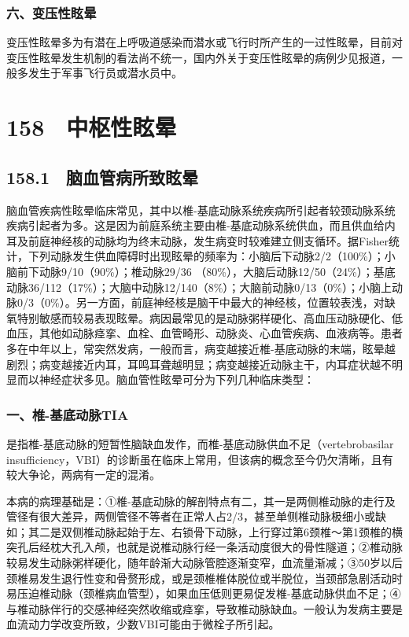 \subsubsection{六、变压性眩晕}

变压性眩晕多为有潜在上呼吸道感染而潜水或飞行时所产生的一过性眩晕，目前对变压性眩晕发生机制的看法尚不统一，国内外关于变压性眩晕的病例少见报道，一般多发生于军事飞行员或潜水员中。

\protect\hypertarget{text00361.html}{}{}

\section{158　中枢性眩晕}

\subsection{158.1　脑血管病所致眩晕}

脑血管疾病性眩晕临床常见，其中以椎-基底动脉系统疾病所引起者较颈动脉系统疾病引起者为多。这是因为前庭系统主要由椎-基底动脉系统供血，而且供血给内耳及前庭神经核的动脉均为终末动脉，发生病变时较难建立侧支循环。据Fisher统计，下列动脉发生供血障碍时出现眩晕的频率为：小脑后下动脉2/2（100\%）；小脑前下动脉9/10（90\%）；椎动脉29/36
（80\%），大脑后动脉12/50（24\%）；基底动脉36/112（17\%）；大脑中动脉12/140（8\%）；大脑前动脉0/13（0\%）；小脑上动脉0/3（0\%）。另一方面，前庭神经核是脑干中最大的神经核，位置较表浅，对缺氧特别敏感而较易表现眩晕。病因最常见的是动脉粥样硬化、高血压动脉硬化、低血压，其他如动脉痉挛、血栓、血管畸形、动脉炎、心血管疾病、血液病等。患者多在中年以上，常突然发病，一般而言，病变越接近椎-基底动脉的末端，眩晕越剧烈；病变越接近内耳，耳鸣耳聋越明显；病变越接近动脉主干，内耳症状越不明显而以神经症状多见。脑血管性眩晕可分为下列几种临床类型：

\subsubsection{一、椎-基底动脉TIA}

是指椎-基底动脉的短暂性脑缺血发作，而椎-基底动脉供血不足（vertebrobasilar
insufficiency，VBI）的诊断虽在临床上常用，但该病的概念至今仍欠清晰，且有较大争论，两病有一定的混淆。

本病的病理基础是：①椎-基底动脉的解剖特点有二，其一是两侧椎动脉的走行及管径有很大差异，两侧管径不等者在正常人占2/3，甚至单侧椎动脉极细小或缺如；其二是双侧椎动脉起始于左、右锁骨下动脉，上行穿过第6颈椎～第1颈椎的横突孔后经枕大孔入颅，也就是说椎动脉行经一条活动度很大的骨性隧道；②椎动脉较易发生动脉粥样硬化，随年龄渐大动脉管腔逐渐变窄，血流量渐减；③50岁以后颈椎易发生退行性变和骨赘形成，或是颈椎椎体脱位或半脱位，当颈部急剧活动时易压迫椎动脉（颈椎病血管型），如果血压低则更易促发椎-基底动脉供血不足；④与椎动脉伴行的交感神经突然收缩或痉挛，导致椎动脉缺血。一般认为发病主要是血流动力学改变所致，少数VBI可能由于微栓子所引起。

